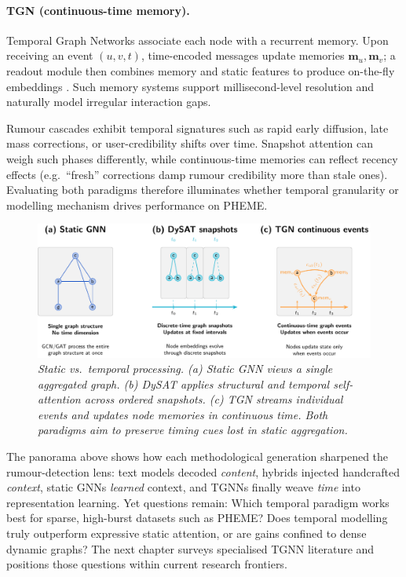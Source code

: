 \documentclass{cshonours}
\begin{document}
\paragraph{TGN (continuous-time memory).}
Temporal Graph Networks associate each node with a recurrent memory.  
Upon receiving an event \((u,v,t)\), time-encoded messages update memories \(\mathbf{m}_u,\mathbf{m}_v\); a readout module then combines memory and static features to produce on-the-fly embeddings \cite{rossi2020tgn}.  
Such memory systems support millisecond-level resolution and naturally model irregular interaction gaps.


Rumour cascades exhibit temporal signatures such as rapid early diffusion, late mass corrections, or user-credibility shifts over time.  Snapshot attention can weigh such phases differently, while continuous-time memories can reflect recency effects (e.g.\ ``fresh'' corrections damp rumour credibility more than stale ones).  Evaluating both paradigms therefore illuminates whether temporal granularity or modelling mechanism drives performance on PHEME.

\begin{figure}[htbp]
  \centering
  \includegraphics[width=.9\textwidth]{../figures/static_vs_temporal.pdf}
  \caption[Static vs.~temporal processing]{\textit{Static vs.~temporal processing.  (a) Static GNN views a single aggregated graph. (b) DySAT applies structural \emph{and} temporal self-attention across ordered snapshots. (c) TGN streams individual events and updates node memories in continuous time.  Both paradigms aim to preserve timing cues lost in static aggregation.}}
  \label{fig:temporal_overview}
\end{figure}


The panorama above shows how each methodological generation sharpened the rumour-detection lens:  
text models decoded \emph{content}, hybrids injected handcrafted \emph{context}, static GNNs \emph{learned} context, and TGNNs finally weave \emph{time} into representation learning.  Yet questions remain: Which temporal paradigm works best for sparse, high-burst datasets such as PHEME?  Does temporal modelling truly outperform expressive static attention, or are gains confined to dense dynamic graphs?  The next chapter surveys specialised TGNN literature and positions those questions within current research frontiers.
\end{document}
